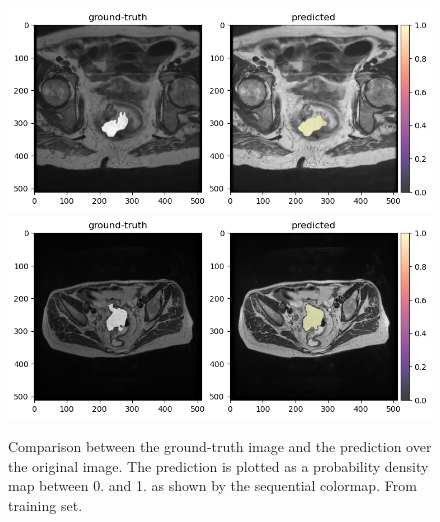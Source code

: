 \documentclass{standalone}
\begin{document}
\begin{figure}[htp]

    \centering
    \includegraphics[width=\textwidth]{../images/predoutputoverlap3.png}
    \includegraphics[width=\textwidth]{../images/predoutputoverlap4.png}
    
    \caption{Comparison between the ground-truth image and the prediction over the original image.
    The prediction is plotted as a probability density map between 0. and 1. as shown by the sequential colormap.
    From training set.}\label{predoverlaptraining2}

\end{figure}
\end{document}
